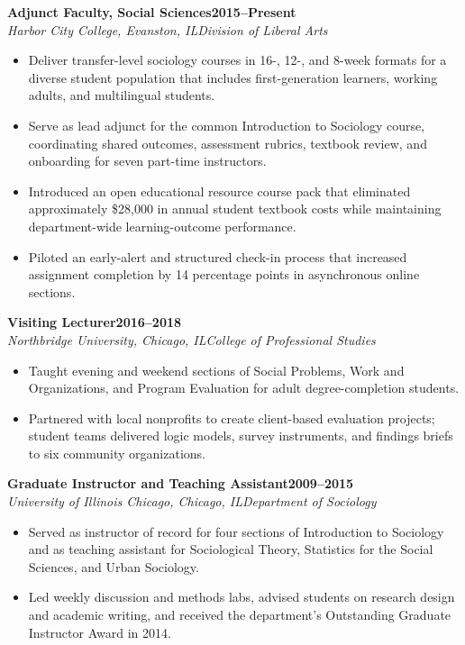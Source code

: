\documentclass[10pt,letterpaper]{article}
\newcommand{\appointment}[4]{%
  \Needspace{5\baselineskip}%
  \textbf{\color{Navy}#1}\hfill\textbf{#2}\\[-1pt]
  \textit{#3}\hfill\textit{\color{Muted}#4}\par
}
\begin{document}
\appointment{Adjunct Faculty, Social Sciences}{2015--Present}{Harbor City College, Evanston, IL}{Division of Liberal Arts}
\begin{itemize}
  \item Deliver transfer-level sociology courses in 16-, 12-, and 8-week formats for a diverse student population that includes first-generation learners, working adults, and multilingual students.
  \item Serve as lead adjunct for the common Introduction to Sociology course, coordinating shared outcomes, assessment rubrics, textbook review, and onboarding for seven part-time instructors.
  \item Introduced an open educational resource course pack that eliminated approximately \$28,000 in annual student textbook costs while maintaining department-wide learning-outcome performance.
  \item Piloted an early-alert and structured check-in process that increased assignment completion by 14 percentage points in asynchronous online sections.
\end{itemize}

\appointment{Visiting Lecturer}{2016--2018}{Northbridge University, Chicago, IL}{College of Professional Studies}
\begin{itemize}
  \item Taught evening and weekend sections of Social Problems, Work and Organizations, and Program Evaluation for adult degree-completion students.
  \item Partnered with local nonprofits to create client-based evaluation projects; student teams delivered logic models, survey instruments, and findings briefs to six community organizations.
\end{itemize}

\appointment{Graduate Instructor and Teaching Assistant}{2009--2015}{University of Illinois Chicago, Chicago, IL}{Department of Sociology}
\begin{itemize}
  \item Served as instructor of record for four sections of Introduction to Sociology and as teaching assistant for Sociological Theory, Statistics for the Social Sciences, and Urban Sociology.
  \item Led weekly discussion and methods labs, advised students on research design and academic writing, and received the department's Outstanding Graduate Instructor Award in 2014.
\end{itemize}
\end{document}

